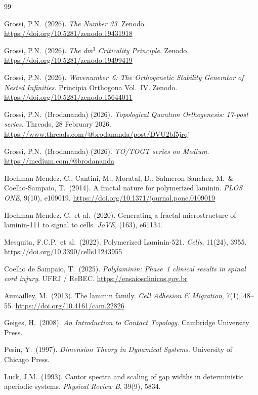 \documentclass[12pt,a4paper]{article}
\begin{document}
\begin{thebibliography}{99}

Grossi, P.N.\ (2026).
\textit{The Number 33}.
Zenodo. \url{https://doi.org/10.5281/zenodo.19431918}

Grossi, P.N.\ (2026).
\textit{The dm$^3$ Criticality Principle}.
Zenodo. \url{https://doi.org/10.5281/zenodo.19499419}

Grossi, P.N.\ (2026).
\textit{Wavenumber~6: The Orthogenetic Stability Generator
of Nested Infinities}. Principia Orthogona Vol.\ IV.
Zenodo. \url{https://doi.org/10.5281/zenodo.15644011}

Grossi, P.N.\ (Brodananda) (2026).
\textit{Topological Quantum Orthogenesis: 17-post series}.
Threads, 28 February 2026.
\url{https://www.threads.com/@brodananda/post/DVU2bf5jrqj}

Grossi, P.N.\ (Brodananda) (2026).
\textit{TO/TOGT series on Medium}.
\url{https://medium.com/@brodananda}

Hochman-Mendez, C., Cantini, M., Moratal, D.,
Salmeron-Sanchez, M.\ \& Coelho-Sampaio, T.\ (2014).
A fractal nature for polymerized laminin.
\textit{PLOS ONE}, 9(10), e109019.
\url{https://doi.org/10.1371/journal.pone.0109019}

Hochman-Mendez, C.\ et al.\ (2020).
Generating a fractal microstructure of laminin-111 to signal to cells.
\textit{JoVE}, (163), e61134.

Mesquita, F.C.P.\ et al.\ (2022).
Polymerized Laminin-521.
\textit{Cells}, 11(24), 3955.
\url{https://doi.org/10.3390/cells11243955}

Coelho de Sampaio, T.\ (2025).
\textit{Polylaminin: Phase~1 clinical results in spinal cord injury}.
UFRJ / ReBEC.
\url{https://ensaiosclinicos.gov.br}

Aumailley, M.\ (2013).
The laminin family.
\textit{Cell Adhesion \& Migration}, 7(1), 48--55.
\url{https://doi.org/10.4161/cam.22826}

Geiges, H.\ (2008).
\textit{An Introduction to Contact Topology}.
Cambridge University Press.

Pesin, Y.\ (1997).
\textit{Dimension Theory in Dynamical Systems}.
University of Chicago Press.

Luck, J.M.\ (1993).
Cantor spectra and scaling of gap widths in deterministic
aperiodic systems.
\textit{Physical Review B}, 39(9), 5834.


\end{thebibliography}
\end{document}
